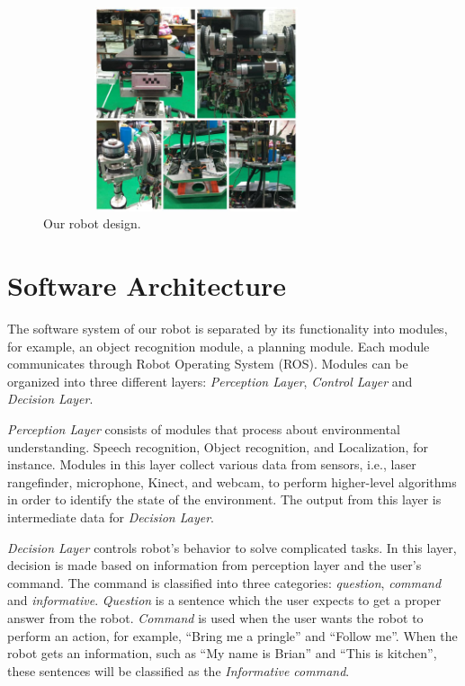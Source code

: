 \documentclass{llncs}
\newcommand{\dq}[1]{``#1''}
\begin{document}
\begin{figure}
\centering
\includegraphics[width=9cm, height=6cm]{realrobot}
\caption{Our robot design.}
\label{fig:base}
\end{figure}

\section{Software Architecture}
The software system of our robot is separated by its functionality into modules, for example, an object recognition module, a planning module. Each module communicates through Robot Operating System (ROS). Modules can be organized into three different layers:   \textit{Perception Layer}, \textit{Control Layer} and \textit{Decision Layer}.

\textit{Perception Layer} consists of modules that process about environmental understanding.  Speech recognition, Object recognition, and Localization, for instance. Modules in this layer collect various data from sensors, i.e., laser rangefinder, microphone, Kinect, and webcam, to perform higher-level algorithms in order to identify the state of the environment. The output from this layer is intermediate data for \textit{Decision Layer}.

\textit{Decision Layer} controls robot's behavior to solve complicated tasks. In this layer, decision is made based on information from perception layer and the user's command. The command is classified into three categories: \textit{question}, \textit{command} and \textit{informative}. \textit{Question} is a sentence which the user expects to get a proper answer from the robot. \textit{Command} is used when the user wants the robot to perform an action, for example, \dq{Bring me a pringle} and \dq{Follow me}. When the robot gets an information, such as \dq{My name is Brian} and \dq{This is kitchen}, these sentences will be classified as the \textit{Informative command}. 
\end{document}
